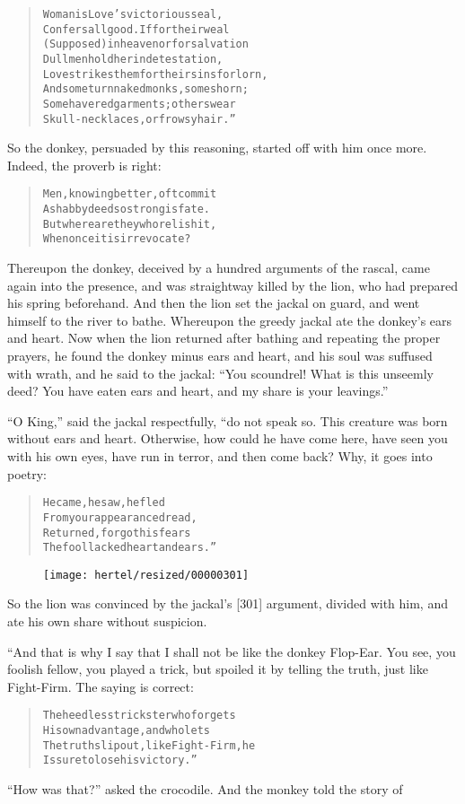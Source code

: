 \documentclass[article, twoside, 10pt]{memoir}
\renewenvironment{verbatim}{%
\begin{quote}%
\vskip -10pt%
\begin{alltt}\normalfont\small}{\end{alltt}%
\end{quote}%
\vskip -10pt
} %
\begin{document}
\begin{verbatim}
Woman is Love's victorious seal,
Confers all good. If for their weal
(Supposed) in heaven or for salvation
Dull men hold her in detestation,
Love strikes them for their sins forlorn,
And some turn naked monks, some shorn;
Some have red garments; others wear
Skull-necklaces, or frowsy hair.”
\end{verbatim}
So the donkey, persuaded by this reasoning, started off with him
once more. Indeed, the proverb is right:

\begin{verbatim}
Men, knowing better, oft commit
    A shabby deed{\textemdash}so strong is fate.
But where are they who relish it,
    When once it is irrevocate?
\end{verbatim}
Thereupon the donkey, deceived by a hundred arguments of the
rascal, came again into the presence, and was straightway killed by
the lion, who had prepared his spring beforehand. And then the lion
set the jackal on guard, and went himself to the river to bathe.
Whereupon the greedy jackal ate the donkey's ears and heart. Now
when the lion returned after bathing and repeating the proper
prayers, he found the donkey minus ears and heart, and his soul was
suffused with wrath, and he said to the jackal:
``You scoundrel! What is this unseemly deed? You have eaten ears and heart, and my share is your leavings.''

``O King,'' said the jackal respectfully, “do not speak so. This
creature was born without ears and heart. Otherwise, how could he
have come here, have seen you with his own eyes, have run in
terror, and then come back? Why, it goes into poetry:

\begin{verbatim}
He came, he saw, he fled
From your appearance dread,
Returned, forgot his fears{\textemdash}
The fool lacked heart and ears.”
\end{verbatim}
\begin{figure}[p]\texttt{[image: hertel/resized/00000301]}\end{figure}So the lion was convinced by the jackal's [301] argument, divided
with him, and ate his own share without suspicion.

“And that is why I say that I shall not be like the donkey
Flop-Ear. You see, you foolish fellow, you played a trick, but
spoiled it by telling the truth, just like Fight-Firm. The saying
is correct:

\begin{verbatim}
The heedless trickster who forgets
His own advantage, and who lets
The truth slip out, like Fight-Firm, he
Is sure to lose his victory.”
\end{verbatim}
``How was that?'' asked the crocodile. And the monkey told the
story of
\end{document}
